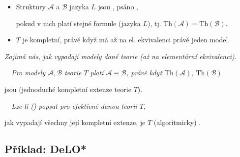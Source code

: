 \begin{itemize}
    \item Struktury $\mathcal{A}$ a $\mathcal{B}$ jazyka $L$ jsou , psáno ,
    \smallskip
    
    pokud v nich platí stejné formule (jazyka $L$), tj. $\mathrm{Th}(\mathcal{A})=\mathrm{Th}(\mathcal{B})$.
    \medskip
    
    \smallskip
    
    \medskip
    
    \item $T$ je kompletní, právě když má až na el. ekvivalenci právě jeden model.
    \medskip
    
    \end{itemize}
    \medskip
    
    {\it Zajímá nás, jak vypadají modely dané teorie (až na elementární ekvivalenci).}
    \medskip
    
    {\it {}\ \ Pro modely $\mathcal{A}, \mathcal{B}$ teorie $T$ platí $\mathcal{A}\equiv \mathcal{B}$, právě když $\mathrm{Th}(\mathcal{A})$, $\mathrm{Th}(\mathcal{B})$
    \smallskip
    
    jsou  (jednoduché kompletní extenze teorie $T$).}
    \bigskip
    
    {\it {}\ \ Lze-li  () popsat pro efektivně danou teorii $T$,
    \smallskip
    
    jak vypadají všechny její kompletní extenze, je $T$ (algoritmicky) .}
    

\subsection{Příklad: DeLO*}\todo

